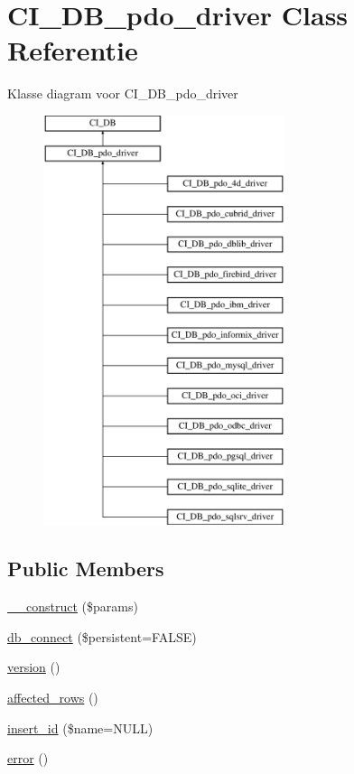 \hypertarget{class_c_i___d_b__pdo__driver}{}\section{C\+I\+\_\+\+D\+B\+\_\+pdo\+\_\+driver Class Referentie}
\label{class_c_i___d_b__pdo__driver}
Klasse diagram voor C\+I\+\_\+\+D\+B\+\_\+pdo\+\_\+driver\begin{figure}[H]
\begin{center}
\leavevmode
\includegraphics[height=12.000000cm]{class_c_i___d_b__pdo__driver}
\end{center}
\end{figure}
\subsection*{Public Members}
\begin{DoxyCompactItemize}
\item 
\mbox{\hyperlink{class_c_i___d_b__pdo__driver_a9162320adff1a1a4afd7f2372f753a3e}{\+\_\+\+\_\+construct}} (\$params)
\item 
\mbox{\hyperlink{class_c_i___d_b__pdo__driver_a52bf595e79e96cc0a7c907a9b45aeb4d}{db\+\_\+connect}} (\$persistent=F\+A\+L\+SE)
\item 
\mbox{\hyperlink{class_c_i___d_b__pdo__driver_a6080dae0886626b9a4cedb29240708b1}{version}} ()
\item 
\mbox{\hyperlink{class_c_i___d_b__pdo__driver_a77248aaad33eb132c04cc4aa3f4bc8cb}{affected\+\_\+rows}} ()
\item 
\mbox{\hyperlink{class_c_i___d_b__pdo__driver_ae61dc2c85e5516f143f6246c686bc3fc}{insert\+\_\+id}} (\$name=N\+U\+LL)
\item 
\mbox{\hyperlink{class_c_i___d_b__pdo__driver_a43b8d30b879d4f09ceb059b02af2bc02}{error}} ()
\end{DoxyCompactItemize}
